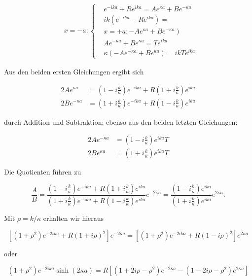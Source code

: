 \documentclass[10pt, letterpaper]{article}
\begin{document}
$$
\begin{aligned}
& x=-a:\left\{\begin{aligned}
& e^{-i k a}+R e^{i k a}=A e^{\kappa a}+B e^{-\kappa a} \\
& i k\left(e^{-i k a}-R e^{i k a}\right)= \\
&\left.x=+a:-A e^{\kappa a}+B e^{-\kappa a}\right) \\
& A e^{-\kappa a}+B e^{\kappa a}=T e^{i k a} \\
& \kappa\left(-A e^{-\kappa a}+B e^{\kappa a}\right)=i k T e^{i k a}
\end{aligned}\right.
\end{aligned}
$$

Aus den beiden ersten Gleichungen ergibt sich

$$
\begin{aligned}
2 A e^{\kappa a} & =\left(1-i \frac{k}{\kappa}\right) e^{-i k a}+R\left(1+i \frac{k}{\kappa}\right) e^{i k a} \\
2 B e^{-\kappa a} & =\left(1+i \frac{k}{\kappa}\right) e^{-i k a}+R\left(1-i \frac{k}{\kappa}\right) e^{i k a}
\end{aligned}
$$

durch Addition und Subtraktion; ebenso aus den beiden letzten Gleichungen:

$$
\begin{aligned}
2 A e^{-\kappa a} & =\left(1-i \frac{k}{\kappa}\right) e^{i k a} T \\
2 B e^{\kappa a} & =\left(1+i \frac{k}{\kappa}\right) e^{i k a} T
\end{aligned}
$$

Die Quotienten führen zu

$$
\frac{A}{B}=\frac{\left(1-i \frac{k}{\kappa}\right) e^{-i k a}+R\left(1+i \frac{k}{\kappa}\right) e^{i k a}}{\left(1+i \frac{k}{\kappa}\right) e^{-i k a}+R\left(1-i \frac{k}{\kappa}\right) e^{i k a}} e^{-2 \kappa a}=\frac{\left(1-i \frac{k}{\kappa}\right) e^{i k a}}{\left(1+i \frac{k}{\kappa}\right) e^{i k a}} e^{2 \kappa a} .
$$

Mit $\rho=k / \kappa$ erhalten wir hieraus

$$
\left[\left(1+\rho^{2}\right) e^{-2 i k a}+R(1+i \rho)^{2}\right] e^{-2 \kappa a}=\left[\left(1+\rho^{2}\right) e^{-2 i k a}+R(1-i \rho)^{2}\right] e^{2 \kappa a}
$$

oder

$$
\left(1+\rho^{2}\right) e^{-2 i k a} \sinh (2 \kappa a)=R\left[\left(1+2 i \rho-\rho^{2}\right) e^{-2 \kappa a}-\left(1-2 i \rho-\rho^{2}\right) e^{2 \kappa a}\right]
$$
\end{document}
